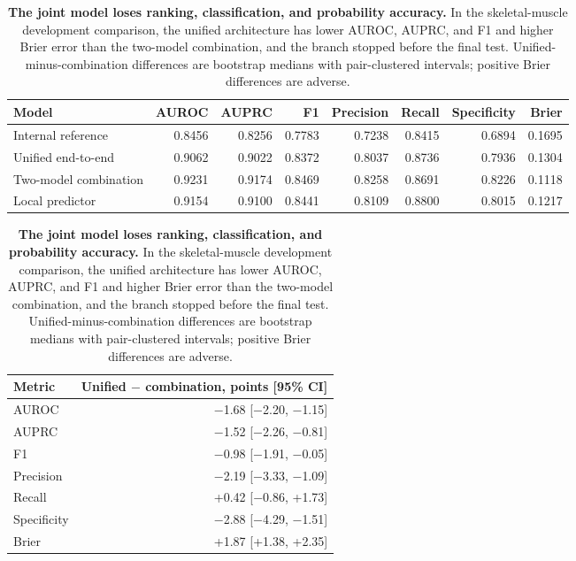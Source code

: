 \begin{table}[H]
\centering
\caption{\textbf{The joint model loses ranking, classification, and probability accuracy.} In the skeletal-muscle development comparison, the unified architecture has lower AUROC, AUPRC, and F1 and higher Brier error than the two-model combination, and the branch stopped before the final test. Unified-minus-combination differences are bootstrap medians with pair-clustered intervals; positive Brier differences are adverse.}\label{tab:unified}
\begin{tabular}{lrrrrrrr}
\toprule
Model & AUROC & AUPRC & F1 & Precision & Recall & Specificity & Brier \\
\midrule
Internal reference & 0.8456 & 0.8256 & 0.7783 & 0.7238 & 0.8415 & 0.6894 & 0.1695 \\
Unified end-to-end & 0.9062 & 0.9022 & 0.8372 & 0.8037 & 0.8736 & 0.7936 & 0.1304 \\
Two-model combination & 0.9231 & 0.9174 & 0.8469 & 0.8258 & 0.8691 & 0.8226 & 0.1118 \\
Local predictor & 0.9154 & 0.9100 & 0.8441 & 0.8109 & 0.8800 & 0.8015 & 0.1217 \\
\bottomrule
\end{tabular}
\vspace{6pt}

\begin{tabular}{lr}
\toprule
Metric & Unified $-$ combination, points [95\% CI] \\
\midrule
AUROC & $-$1.68 [$-$2.20, $-$1.15] \\
AUPRC & $-$1.52 [$-$2.26, $-$0.81] \\
F1 & $-$0.98 [$-$1.91, $-$0.05] \\
Precision & $-$2.19 [$-$3.33, $-$1.09] \\
Recall & +0.42 [$-$0.86, +1.73] \\
Specificity & $-$2.88 [$-$4.29, $-$1.51] \\
Brier & +1.87 [+1.38, +2.35] \\
\bottomrule
\end{tabular}
\end{table}
